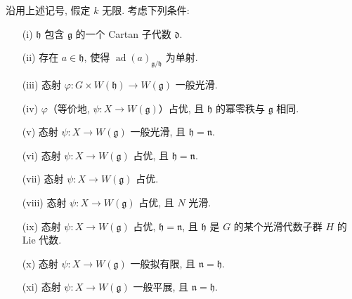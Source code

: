 \begin{theorem}
沿用上述记号, 假定 \(k\) 无限. 考虑下列条件:
\begin{enumerate}
  \item[(i)]
  \(\mathfrak h\) 包含 \(\mathfrak g\) 的一个 Cartan 子代数 \(\mathfrak d\).

  \item[(ii)]
  存在 \(a\in\mathfrak h\), 使得 \(\operatorname{ad}(a)_{\mathfrak g/\mathfrak h}\) 为单射.

  \item[(iii)]
  态射 \(\varphi:G\times W(\mathfrak h)\to W(\mathfrak g)\) 一般光滑.

  \item[(iv)]
   \(\varphi\)（等价地, \(\psi:X\to W(\mathfrak g)\)）占优, 且 \(\mathfrak h\) 的幂零秩与 \(\mathfrak g\) 相同.

  \item[(v)]
  态射 \(\psi:X\to W(\mathfrak g)\) 一般光滑, 且 \(\mathfrak h=\mathfrak n\).

  \item[(vi)]
  态射 \(\psi:X\to W(\mathfrak g)\) 占优, 且 \(\mathfrak h=\mathfrak n\).

  \item[(vii)]
  态射 \(\psi:X\to W(\mathfrak g)\) 占优.

  \item[(viii)]
  态射 \(\psi:X\to W(\mathfrak g)\) 占优, 且 \(N\) 光滑.

  \item[(ix)]
  态射 \(\psi:X\to W(\mathfrak g)\) 占优, \(\mathfrak h=\mathfrak n\), 且 \(\mathfrak h\) 是 \(G\) 的某个光滑代数子群 \(H\) 的 Lie 代数.

  \item[(x)]
  态射 \(\psi:X\to W(\mathfrak g)\) 一般拟有限, 且 \(\mathfrak n=\mathfrak h\).

  \item[(xi)]
  态射 \(\psi:X\to W(\mathfrak g)\) 一般平展, 且 \(\mathfrak n=\mathfrak h\).


\end{enumerate}
\end{theorem}
